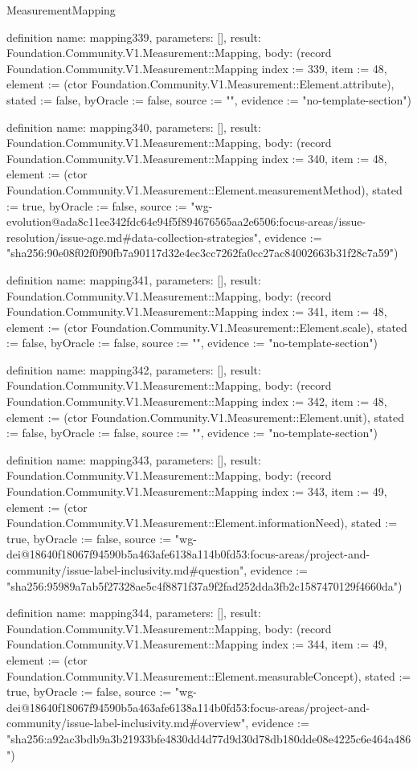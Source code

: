 \begin{lexlean}{MeasurementMapping}
\begin{semanticmodule}
definition{
  name: mapping339,
  parameters: [],
  result: Foundation.Community.V1.Measurement::Mapping,
  body: (record Foundation.Community.V1.Measurement::Mapping {index := 339, item := 48, element := (ctor Foundation.Community.V1.Measurement::Element.attribute), stated := false, byOracle := false, source := "", evidence := "no-template-section"})
}

definition{
  name: mapping340,
  parameters: [],
  result: Foundation.Community.V1.Measurement::Mapping,
  body: (record Foundation.Community.V1.Measurement::Mapping {index := 340, item := 48, element := (ctor Foundation.Community.V1.Measurement::Element.measurementMethod), stated := true, byOracle := false, source := "wg-evolution@ada8c11ee342fdc64e94f5f894676565aa2e6506:focus-areas/issue-resolution/issue-age.md#data-collection-strategies", evidence := "sha256:90e08f02f0f90fb7a90117d32e4ec3cc7262fa0cc27ac84002663b31f28c7a59"})
}

definition{
  name: mapping341,
  parameters: [],
  result: Foundation.Community.V1.Measurement::Mapping,
  body: (record Foundation.Community.V1.Measurement::Mapping {index := 341, item := 48, element := (ctor Foundation.Community.V1.Measurement::Element.scale), stated := false, byOracle := false, source := "", evidence := "no-template-section"})
}

definition{
  name: mapping342,
  parameters: [],
  result: Foundation.Community.V1.Measurement::Mapping,
  body: (record Foundation.Community.V1.Measurement::Mapping {index := 342, item := 48, element := (ctor Foundation.Community.V1.Measurement::Element.unit), stated := false, byOracle := false, source := "", evidence := "no-template-section"})
}

definition{
  name: mapping343,
  parameters: [],
  result: Foundation.Community.V1.Measurement::Mapping,
  body: (record Foundation.Community.V1.Measurement::Mapping {index := 343, item := 49, element := (ctor Foundation.Community.V1.Measurement::Element.informationNeed), stated := true, byOracle := false, source := "wg-dei@18640f18067f94590b5a463afe6138a114b0fd53:focus-areas/project-and-community/issue-label-inclusivity.md#question", evidence := "sha256:95989a7ab5f27328ae5c4f8871f37a9f2fad252dda3fb2c1587470129f4660da"})
}

definition{
  name: mapping344,
  parameters: [],
  result: Foundation.Community.V1.Measurement::Mapping,
  body: (record Foundation.Community.V1.Measurement::Mapping {index := 344, item := 49, element := (ctor Foundation.Community.V1.Measurement::Element.measurableConcept), stated := true, byOracle := false, source := "wg-dei@18640f18067f94590b5a463afe6138a114b0fd53:focus-areas/project-and-community/issue-label-inclusivity.md#overview", evidence := "sha256:a92ac3bdb9a3b21933bfe4830dd4d77d9d30d78db180dde08e4225c6e464a486"})
}


\end{semanticmodule}
\end{lexlean}

